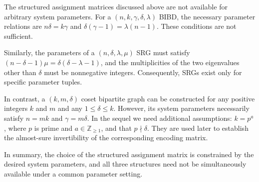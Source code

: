 \documentclass[journal,draftcls,onecolumn]{IEEEtran}
\theoremstyle{mystyle}
\newtheorem{defn}{Definition}
\begin{document}
The structured assignment matrices discussed above are not available for
arbitrary system parameters. For a $(n,k,\gamma,\delta,\lambda)$ BIBD,
the necessary parameter relations are $n\delta=k\gamma$ and
$\delta(\gamma-1)=\lambda(n-1)$. These conditions are not
sufficient. 

Similarly, the parameters of a $(n,\delta,\lambda,\mu)$ SRG must satisfy
$(n-\delta-1)\mu=\delta(\delta-\lambda-1)$, and the multiplicities of the
two eigenvalues other than $\delta$ must be nonnegative integers. Consequently, SRGs exist only for specific parameter tuples.

In contrast, a $(k,m,\delta)$ coset bipartite graph can be constructed for
any positive integers $k$ and $m$ and any $1\leq\delta\leq k$. However, its
system parameters necessarily satisfy $n=mk$ and $\gamma=m\delta$. In the sequel we need additional assumptions: $k=p^a$, where $p$ is prime and
$a\in\mathbb{Z}_{\geq 1}$, and that $p\nmid\delta$. They are used later to establish
the almost-sure invertibility of the corresponding encoding matrix. 

In summary, the
choice of the structured assignment matrix is constrained by the desired
system parameters, and all three structures need not be simultaneously
available under a common parameter setting.




















\end{document}
